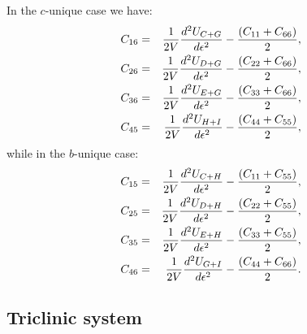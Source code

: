 \documentclass[12pt,a4paper,twoside]{report}
\begin{document}
In the $c$-unique case we have:
\begin{eqnarray}
C_{16}&=&{1 \over 2 V} {d^2 U_{C+G} \over d \epsilon^2} - {(C_{11} + C_{66})\over 2}, \\
C_{26}&=&{1 \over 2 V} {d^2 U_{D+G} \over d \epsilon^2} - {(C_{22} + C_{66})\over 2}, \\
C_{36}&=&{1 \over 2 V} {d^2 U_{E+G} \over d \epsilon^2} - {(C_{33} + C_{66})\over 2}, \\
C_{45}&=&{1 \over 2 V} {d^2 U_{H+I} \over d \epsilon^2} - {(C_{44} + C_{55})\over 2},
\end{eqnarray}
while in the $b$-unique case:
\begin{eqnarray}
C_{15}&=&{1 \over 2 V} {d^2 U_{C+H} \over d \epsilon^2} - {(C_{11} + C_{55})\over 2}, \\
C_{25}&=&{1 \over 2 V} {d^2 U_{D+H} \over d \epsilon^2} - {(C_{22} + C_{55})\over 2}, \\
C_{35}&=&{1 \over 2 V} {d^2 U_{E+H} \over d \epsilon^2} - {(C_{33} + C_{55})\over 2}, \\
C_{46}&=&{1 \over 2 V} {d^2 U_{G+I} \over d \epsilon^2} - {(C_{44} + C_{66})\over 2}. 
\end{eqnarray}

{\color{web-blue}\subsection{Triclinic system}}
\color{black}
\end{document}
